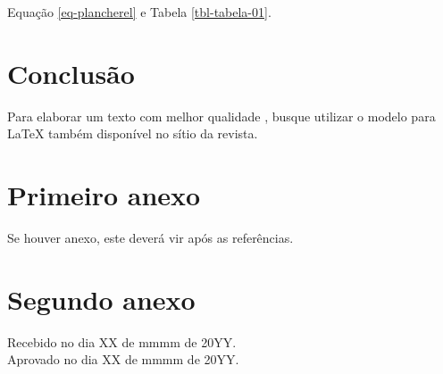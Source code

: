 \documentclass[red]{textolivre}
\begin{document}
\lipsum[20-21]
Equação \ref{eq-plancherel} e Tabela \ref{tbl-tabela-01}.

\section{Conclusão}
Para elaborar um texto com melhor qualidade \cite{donaldknuth1984,leslielamport1994}, busque utilizar o modelo para \LaTeX{} também
disponível no sítio da revista.

\lipsum[17-19]

\printbibliography[title=Refer\^{e}ncias]

\appendix
\section{Primeiro anexo}
Se houver anexo, este deverá vir após as referências.
\lipsum[1]

\section{Segundo anexo}
\lipsum[2]

\vspace{2cm}
\begin{flushright}
Recebido no dia XX de mmmm de 20YY.\\
Aprovado no dia XX de mmmm de 20YY.
\end{flushright}
\end{document}

